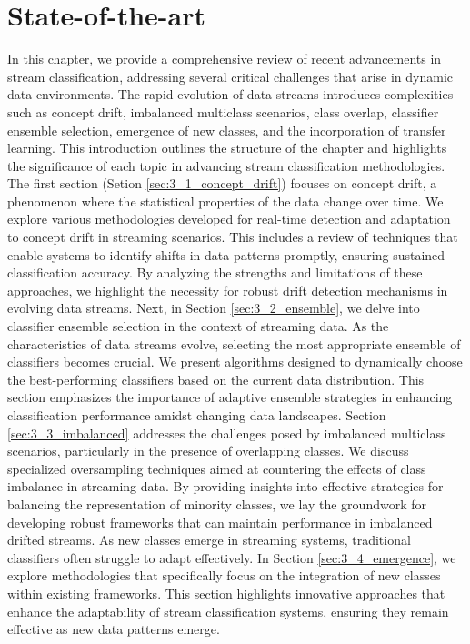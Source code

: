 \chapter{State-of-the-art}
\label{cha:3_State-of-the-art}


In this chapter, we provide a comprehensive review of recent advancements in stream classification, addressing several critical challenges that arise in dynamic data environments. The rapid evolution of data streams introduces complexities such as concept drift, imbalanced multiclass scenarios, class overlap, classifier ensemble selection, emergence of new classes, and the incorporation of transfer learning. This introduction outlines the structure of the chapter and highlights the significance of each topic in advancing stream classification methodologies.
The first section (Setion \ref{sec:3_1_concept_drift}) focuses on concept drift, a phenomenon where the statistical properties of the data change over time. We explore various methodologies developed for real-time detection and adaptation to concept drift in streaming scenarios. This includes a review of techniques that enable systems to identify shifts in data patterns promptly, ensuring sustained classification accuracy. By analyzing the strengths and limitations of these approaches, we highlight the necessity for robust drift detection mechanisms in evolving data streams.
Next, in Section \ref{sec:3_2_ensemble}, we delve into classifier ensemble selection in the context of streaming data. As the characteristics of data streams evolve, selecting the most appropriate ensemble of classifiers becomes crucial. We present algorithms designed to dynamically choose the best-performing classifiers based on the current data distribution. This section emphasizes the importance of adaptive ensemble strategies in enhancing classification performance amidst changing data landscapes.
Section \ref{sec:3_3_imbalanced} addresses the challenges posed by imbalanced multiclass scenarios, particularly in the presence of overlapping classes. We discuss specialized oversampling techniques aimed at countering the effects of class imbalance in streaming data. By providing insights into effective strategies for balancing the representation of minority classes, we lay the groundwork for developing robust frameworks that can maintain performance in imbalanced drifted streams.
As new classes emerge in streaming systems, traditional classifiers often struggle to adapt effectively. In Section \ref{sec:3_4_emergence}, we explore methodologies that specifically focus on the integration of new classes within existing frameworks. This section highlights innovative approaches that enhance the adaptability of stream classification systems, ensuring they remain effective as new data patterns emerge.

